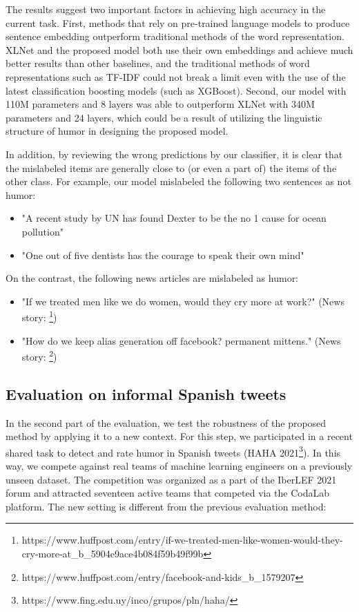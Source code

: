 \documentclass{article}
\begin{document}
The results suggest two important factors in achieving high accuracy in the current task. First, methods that rely on pre-trained language models to produce sentence embedding outperform traditional methods of the word representation. XLNet and the proposed model both use their own embeddings and achieve much better results than other baselines, and the traditional methods of word representations such as TF-IDF could not break a limit even with the use of the latest classification boosting models (such as XGBoost). Second, our model with 110M parameters and 8 layers was able to outperform XLNet with 340M parameters and 24 layers, which could be a result of utilizing the linguistic structure of humor in designing the proposed model.

In addition, by reviewing the wrong predictions by our classifier, it is clear that the mislabeled items are generally close to (or even a part of) the items of the other class. For example, our model mislabeled the following two sentences as not humor: 

\begin{itemize}
\item "A recent study by UN has found Dexter to be the no 1 cause for ocean pollution"
\end{itemize}
\begin{itemize}
\item "One out of five dentists has the courage to speak their own mind"
\end{itemize}

On the contrast, the following news articles are mislabeled as humor:

\begin{itemize}
\item "If we treated men like we do women, would they cry more at work?" (News story: \footnote{https://www.huffpost.com/entry/if-we-treated-men-like-women-would-they-cry-more-at\_b\_5904e9ace4b084f59b49f99b})
\item "How do we keep alias generation off facebook? permanent mittens." (News story: \footnote{https://www.huffpost.com/entry/facebook-and-kids\_b\_1579207})
\end{itemize}

\subsection{Evaluation on informal Spanish tweets}

In the second part of the evaluation, we test the robustness of the proposed method by applying it to a new context. For this step, we participated in a recent shared task to detect and rate humor in Spanish tweets (HAHA 2021\footnote{https://www.fing.edu.uy/inco/grupos/pln/haha/}). In this way, we compete against real teams of machine learning engineers on a previously unseen dataset. The competition was organized as a part of the IberLEF 2021 forum and attracted seventeen active teams that competed via the CodaLab platform. The new setting is different from the previous evaluation method:
\end{document}
